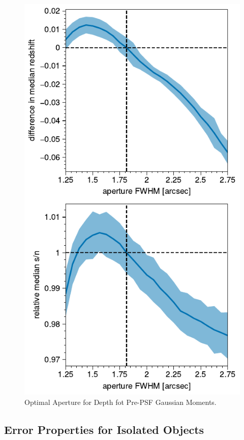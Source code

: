 \documentclass[twocolappendix, appendixfloats, numberedappendix, twocolumn, apj]{openjournal}
\begin{document}
\begin{figure}
  \centering
  \vspace{1em}
  \includegraphics[width=\columnwidth]{figures/optap_depth.pdf}
  \caption{
    Optimal Aperture for Depth fot Pre-PSF Gaussian Moments.
    \label{fig:opap_depth}
  }
\end{figure}


\subsection{Error Properties for Isolated Objects}
\end{document}
